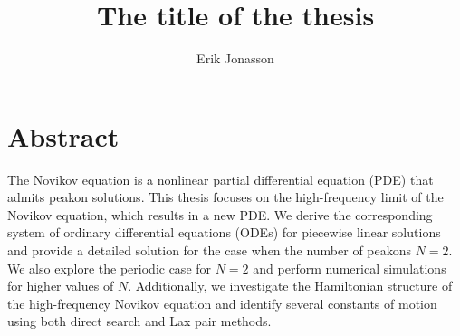 \documentclass[english,master]{liumaiex}
\theoremstyle{plain}
\theoremstyle{definition}
\begin{document}
%
%
\title{The title of the thesis}
\author{Erik Jonasson}

\maketitle


%
%
\section*{Abstract}

The Novikov equation is a nonlinear partial differential equation (PDE) that admits peakon solutions. This thesis focuses on the high-frequency limit of the Novikov equation, which results in a new PDE. We derive the corresponding system of ordinary differential equations (ODEs) for piecewise linear solutions and provide a detailed solution for the case when the number of peakons \(N = 2\). We also explore the periodic case for \(N = 2\) and perform numerical simulations for higher values of \(N\). Additionally, we investigate the Hamiltonian structure of the high-frequency Novikov equation and identify several constants of motion using both direct search and Lax pair methods.
\end{document}

